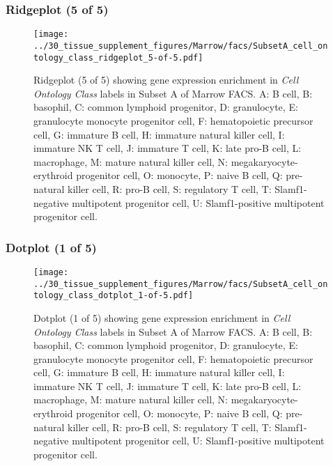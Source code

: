 \subsubsection{Ridgeplot (5 of 5)}
\begin{figure}[h]
\centering
\texttt{[image: ../30\_tissue\_supplement\_figures/Marrow/facs/SubsetA\_cell\_ontology\_class\_ridgeplot\_5-of-5.pdf]}

\caption{ Ridgeplot (5 of 5)  showing gene expression enrichment in \emph{Cell Ontology Class} labels in Subset A of Marrow FACS. A: B cell, B: basophil, C: common lymphoid progenitor, D: granulocyte, E: granulocyte monocyte progenitor cell, F: hematopoietic precursor cell, G: immature B cell, H: immature natural killer cell, I: immature NK T cell, J: immature T cell, K: late pro-B cell, L: macrophage, M: mature natural killer cell, N: megakaryocyte-erythroid progenitor cell, O: monocyte, P: naive B cell, Q: pre-natural killer cell, R: pro-B cell, S: regulatory T cell, T: Slamf1-negative multipotent progenitor cell, U: Slamf1-positive multipotent progenitor cell.}
\end{figure}


\clearpage

\subsubsection{Dotplot (1 of 5)}
\begin{figure}[h]
\centering
\texttt{[image: ../30\_tissue\_supplement\_figures/Marrow/facs/SubsetA\_cell\_ontology\_class\_dotplot\_1-of-5.pdf]}

\caption{ Dotplot (1 of 5)  showing gene expression enrichment in \emph{Cell Ontology Class} labels in Subset A of Marrow FACS. A: B cell, B: basophil, C: common lymphoid progenitor, D: granulocyte, E: granulocyte monocyte progenitor cell, F: hematopoietic precursor cell, G: immature B cell, H: immature natural killer cell, I: immature NK T cell, J: immature T cell, K: late pro-B cell, L: macrophage, M: mature natural killer cell, N: megakaryocyte-erythroid progenitor cell, O: monocyte, P: naive B cell, Q: pre-natural killer cell, R: pro-B cell, S: regulatory T cell, T: Slamf1-negative multipotent progenitor cell, U: Slamf1-positive multipotent progenitor cell.}
\end{figure}


\clearpage

